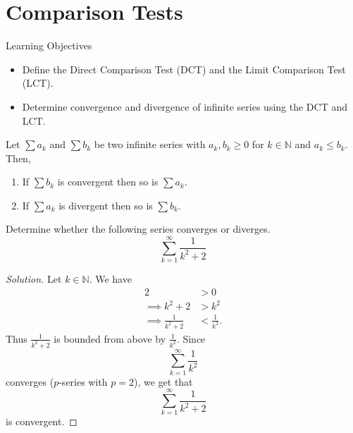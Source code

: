 \documentclass[compacto,10pt,comentarios]{aleph-notas}
\begin{document}
\encabezado
\section*{Comparison Tests}
\begin{mdframed}
    \center Learning Objectives \\
    \begin{itemize}
        \item Define the Direct Comparison Test (DCT) and the Limit Comparison Test (LCT).
        \item Determine convergence and divergence of infinite series using the DCT and LCT.
    \end{itemize}
\end{mdframed}

\begin{teo}
    Let $\sum a_k$ and $\sum b_k$ be two infinite series with $a_k, b_k \geq 0$ for $k \in \mathbb{N}$ and $a_k \leq b_k$. Then,
    \begin{enumerate}
        \item If $\sum b_k$ is convergent then so is $\sum a_k$.
        \item If $\sum a_k$ is divergent then so is $\sum b_k$.
    \end{enumerate}
\end{teo}

\begin{ejer}
    Determine whether the following series converges or diverges.
    $$
        \sum_{k=1}^{\infty} \frac{1}{k^2 + 2}
    $$
\end{ejer}
\begin{proof}[Solution]
    Let $k \in \mathbb{N}$. We have
    \begin{align*}
        2 & > 0 \\
        \implies k^2 + 2 & > k^2 \\
        \implies \frac{1}{k^2 + 2} & < \frac{1}{k^2}.
    \end{align*}
    Thus $\frac{1}{k^2 + 2}$ is bounded from above by $\frac{1}{k^2}$. Since
    $$
        \sum_{k=1}^{\infty} \frac{1}{k^2}
    $$
    converges ($p$-series with $p=2$), we get that
    $$
        \sum_{k=1}^{\infty} \frac{1}{k^2 + 2}
    $$ is convergent.
\end{proof}
\end{document}
